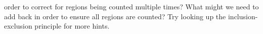 \documentclass{article}
\begin{document}
\begin{enumerate}
        order to correct for regions being counted multiple times? What might we 
        need to add back in order to ensure all regions are counted? Try looking 
        up the inclusion-exclusion principle for more hints.
        \begin{center}
        \end{center}
        \vspace{3cm}
\end{enumerate}
\end{document}
